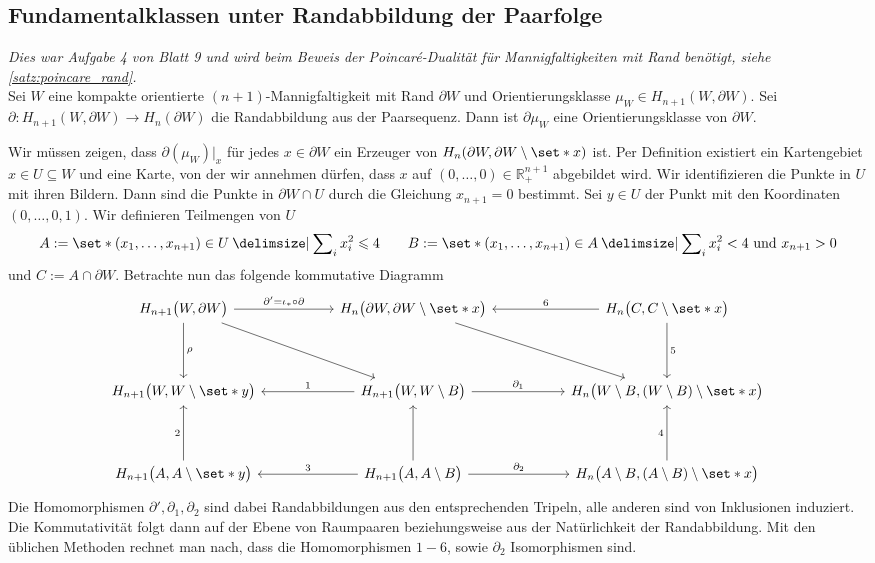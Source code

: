 \subsection{Fundamentalklassen unter Randabbildung der Paarfolge} %
\label{sub:fundamentalklasse_rand}
\emph{Dies war Aufgabe 4 von Blatt 9 und wird beim Beweis der Poincaré-Dualität für Mannigfaltigkeiten mit Rand benötigt, siehe \autoref{satz:poincare_rand}.}\smallskip\\
Sei $W$ eine kompakte orientierte $(n+1)$-Mannigfaltigkeit mit Rand $\partial W$ und Orientierungsklasse $\mu_W \in H_{n+1}(W,\partial W)$.
Sei $\partial \colon H_{n+1}(W,\partial W) \to H_n(\partial W)$ die Randabbildung aus der Paarsequenz.
Dann ist $\partial \mu_W$ eine Orientierungsklasse von $\partial W$.
\begin{beweis}[{name={\cite[\RM{14}. Th.~7.6]{Massey}}}]
	Wir müssen zeigen, dass $\partial(\mu_W)|_x$ für jedes $x \in \partial W$ ein Erzeuger von $H_n(\partial W, \partial W \setminus \set*{x})$ ist.
	Per Definition existiert ein Kartengebiet $x \in U \subseteq W$ und eine Karte, von der wir annehmen dürfen, dass $x$ auf $(0,\ldots ,0) \in \mathbb{R}^{n+1}_+$ abgebildet wird.
	Wir identifizieren die Punkte in $U$ mit ihren Bildern.
	Dann sind die Punkte in $\partial W \cap U$ durch die Gleichung $x_{n+1}=0$ bestimmt.
	Sei $y \in U$ der Punkt mit den Koordinaten $(0,\ldots ,0,1)$.
	Wir definieren Teilmengen von $U$
	\[
		A := \set*{(x_1, \ldots ,x_{n+1}) \in U \given \sum\nolimits_i x_i^2 \le 4 } \qquad B := \set*{(x_1,\ldots ,x_{n+1}) \in A \given \sum\nolimits_i x_i^2 < 4 \text{ und } x_{n+1}>0 }
	\]
	und $C := A \cap \partial W$.
	Betrachte nun das folgende kommutative Diagramm
	\[
		\begin{tikzcd}[row sep=4em, column sep=5.2em]
			H_{n+1} \enbrace[\big]{W,\partial W}\rar["\partial' = \iota_*\circ \partial"] \dar["\rho"] \ar[dr] & H_{n} \enbrace[\big]{\partial W, \partial W \setminus \set*{x}}\drar & H_n \enbrace[\big]{C,C\setminus \set*{x}} \dar["5"] \lar["6"']\\
			H_{n+1} \enbrace[\big]{W,W\setminus \set*{y}} & H_{n+1} \enbrace[\big]{W,W \setminus B}\lar["1"']  \rar["\partial_1"] & H_n \enbrace[\big]{W \setminus B,(W \setminus B) \setminus \set*{x} } \\
			H_{n+1} \enbrace[\big]{A,A\setminus \set*{y}}\uar["2"] & H_{n+1} \enbrace[\big]{A,A \setminus B} \uar \lar["3"'] \rar["\partial_2"] & H_n \enbrace[\big]{A \setminus B, (A \setminus B) \setminus \set*{x}} \uar["4"]
		\end{tikzcd}
	\]
	Die Homomorphismen $\partial',\partial_1, \partial_2$ sind dabei Randabbildungen aus den entsprechenden Tripeln, alle anderen sind von Inklusionen induziert.
	Die Kommutativität folgt dann auf der Ebene von Raumpaaren beziehungsweise aus der Natürlichkeit der Randabbildung.
	Mit den üblichen Methoden rechnet man nach, dass die Homomorphismen $1-6$, sowie $\partial_2$ Isomorphismen sind.
	

\end{beweis}
